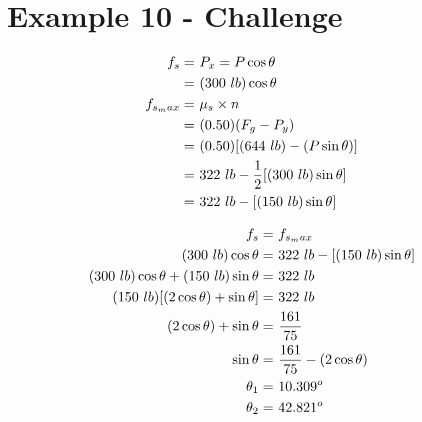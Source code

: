 \chapter{Example 10 - Challenge}

	\begin{align}
		f_{s} = \ &P_{x} = P \cos \theta & \notag \\
		= \ &(300 \ lb) \cos \theta & \notag \\
		f_{s_max} = \ &\mu_{s} \times n& \notag \\
		= \ &(0.50)(F_{g} - P_{y})& \notag \\
		= \ &(0.50)[(644 \ lb) - (P \sin \theta)]& \notag \\
		= \ &322 \ lb - \frac{1}{2}[(300 \ lb) \sin \theta]& \notag \\
		= \ &322 \ lb - [(150 \ lb)\sin \theta]& \notag
	\end{align}

	\begin{align}
		f_{s} = \ &f_{s_max}& \notag \\
		(300 \ lb) \cos \theta = \ &322 \ lb - [(150 \ lb)\sin \theta]& \notag \\
		(300 \ lb) \cos \theta + (150 \ lb)\sin \theta = \ &322 \ lb& \notag \\
		(150 \ lb)[(2 \cos \theta) + \sin \theta] = \ &322 \ lb& \notag \\
		(2 \cos \theta) + \sin \theta = \ &\frac{161}{75}& \notag \\
		\sin \theta = \ &\frac{161}{75} - (2 \cos \theta)& \notag \\
		\theta_{1} = \ &10.309^{o}& \\
		\theta_{2} = \ &42.821^{o}&
	\end{align}
